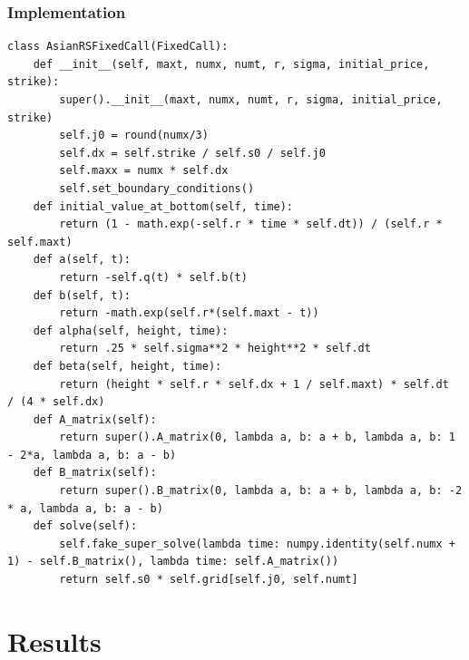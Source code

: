 \documentclass{beamer}
\begin{document}
  \begin{frame}[fragile]
    \frametitle{Implementation}
    \tiny
    \begin{lstlisting}
class AsianRSFixedCall(FixedCall):
    def __init__(self, maxt, numx, numt, r, sigma, initial_price, strike):
        super().__init__(maxt, numx, numt, r, sigma, initial_price, strike)
        self.j0 = round(numx/3)
        self.dx = self.strike / self.s0 / self.j0
        self.maxx = numx * self.dx
        self.set_boundary_conditions()
    def initial_value_at_bottom(self, time):
        return (1 - math.exp(-self.r * time * self.dt)) / (self.r * self.maxt)
    def a(self, t):
        return -self.q(t) * self.b(t)
    def b(self, t):
        return -math.exp(self.r*(self.maxt - t))
    def alpha(self, height, time):
        return .25 * self.sigma**2 * height**2 * self.dt
    def beta(self, height, time):
        return (height * self.r * self.dx + 1 / self.maxt) * self.dt  / (4 * self.dx)
    def A_matrix(self):
        return super().A_matrix(0, lambda a, b: a + b, lambda a, b: 1 - 2*a, lambda a, b: a - b)
    def B_matrix(self):
        return super().B_matrix(0, lambda a, b: a + b, lambda a, b: -2 * a, lambda a, b: a - b)
    def solve(self):
        self.fake_super_solve(lambda time: numpy.identity(self.numx + 1) - self.B_matrix(), lambda time: self.A_matrix())
        return self.s0 * self.grid[self.j0, self.numt]
    \end{lstlisting}
\end{frame}

  \section{Results}
\end{document}
